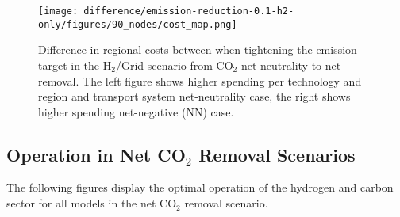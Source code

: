 \documentclass[twocolumn]{article}
\newcommand{\carbon}{CO$_2$}
\newcommand{\hydrogengrid}{H$_2$\=/Grid}
\newcommand{\hydrogenscenario}{H$_2$\=/Grid scenario}
\newcommand{\hybridscenario}{Hybrid scenario}
\begin{document}
\begin{figure}[ht!]
    \centering
    \texttt{[image: difference/emission-reduction-0.1-h2-only/figures/90\_nodes/cost\_map.png]}
    \caption{Difference in regional costs between when tightening the emission target in the \hydrogenscenario{} from \carbon{} net-neutrality to net-removal. The left figure shows higher spending per technology and region and transport system net-neutrality case, the right shows higher spending net-negative (NN) case.}
    \label{fig:cost_map_difference_h2_nn}
\end{figure}









\clearpage
\subsection{Operation in Net \carbon{} Removal Scenarios}
\label{sec:operation_nn}
The following figures display the optimal operation of the hydrogen and carbon sector for all models in the net \carbon{} removal scenario.
\end{document}
